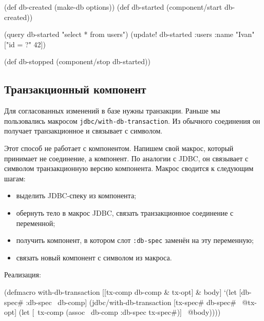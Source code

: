 \else

\begin{english}
  \begin{clojure}
(def db-created (make-db options))
(def db-started (component/start db-created))

(query db-started "select * from users")
(update! db-started :users {:name "Ivan"} ["id = ?" 42])

(def db-stopped (component/stop db-started))
  \end{clojure}
\end{english}

\fi

\subsection{Транзакционный компонент}


Для согласованных изменений в базе нужны транзакции. Раньше мы пользовались
макросом \verb|jdbc/with-db-transaction|. Из обычного соединения он получает
транзакционное и связывает с символом.

Этот способ не работает с компонентом. Напишем свой макрос, который принимает не
соединение, а компонент. По аналогии с JDBC, он связывает с символом
транзакционную версию компонента. Макрос сводится к следующим шагам:

\begin{itemize}

\item
  выделить JDBC-спеку из компонента;

\item
  обернуть тело в макрос JDBC, связать транзакционное соединение с переменной;

\item
  получить компонент, в котором слот \verb|:db-spec| заменён на эту переменную;

\item
  связать новый компонент с символом из макроса.

\end{itemize}

Реализация:

\ifx\DEVICETYPE\MOBILE

\begin{english}
  \begin{clojure}
(defmacro with-db-transaction
  [[tx-comp db-comp & tx-opt] & body]
  `(let [{db-spec# :db-spec} ~db-comp]
     (jdbc/with-db-transaction
       [tx-spec# db-spec# ~@tx-opt]
       (let [~tx-comp
             (assoc ~db-comp
               :db-spec tx-spec#)]
         ~@body))))
  \end{clojure}
\end{english}

